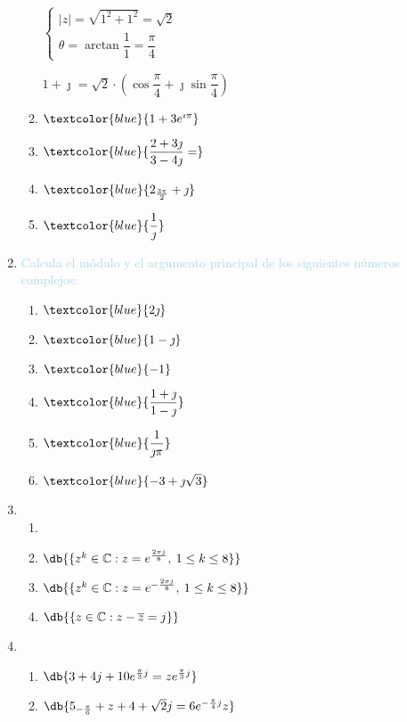 \begin{enumerate}[label=\color{red}\textbf{\arabic*)}, leftmargin=*]
\begin{enumerate}[label=\color{red}\alph*)]
	$\begin{cases}
		|z|=\sqrt{1^2+1^2}=\sqrt{2}\\
		\theta=\arctan\dfrac{1}{1}=\dfrac{\pi}{4}
	\end{cases}$
	
	$1+\jmath=\sqrt{2}\cdot\left(\cos\dfrac{\pi}{4}+\jmath\sin\dfrac{\pi}{4}\right)$
	\item $\textcolor{blue}{1+3e^{\imath\pi}}$
	\item $\textcolor{blue}{\dfrac{2+3\jmath}{3-4\jmath}=}$
	\item $\textcolor{blue}{2_{\frac{3\pi}{2}}+\jmath}$
	\item $\textcolor{blue}{\dfrac{1}{\jmath}}$
\end{enumerate}
\item \textcolor{lightblue}{Calcula el módulo y el argumento principal de los siguientes números complejos:}
\begin{enumerate}[label=\color{red}\alph*)]
	\item $\textcolor{blue}{2\jmath}$
	\item $\textcolor{blue}{1-\jmath}$
	\item $\textcolor{blue}{-1}$
	\item $\textcolor{blue}{\dfrac{1+\jmath}{1-\jmath}}$
	\item $\textcolor{blue}{\dfrac{1}{\jmath\pi}}$
	\item $\textcolor{blue}{-3+\jmath\sqrt{3}}$
\end{enumerate}
\item {}
\begin{enumerate}[label=\color{red}\alph*)]
	\item {}
	\item $\db{\{z^k\in\mathbb{C}:z=e^{\frac{2\pi j}{8}},\:1\le k\le8\}}$
	\item $\db{\{z^k\in\mathbb{C}:z=e^{-\frac{2\pi j}{8}},\:1\le k\le8\}}$
	\item $\db{\{z\in\mathbb{C}:z-\overline{z}=j\}}$
\end{enumerate}
\item {}
\begin{enumerate}[label=\color{red}\alph*)]
	\item $\db{3+4j+10e^{\frac{\pi}{3}j}=ze^{\frac{\pi}{3}j}}$
	\item $\db{5_{-\frac{\pi}{6}}+z+4+\sqrt{2}j=6e^{-\frac{\pi}{4}j}z}$

\end{enumerate}
\end{enumerate}
